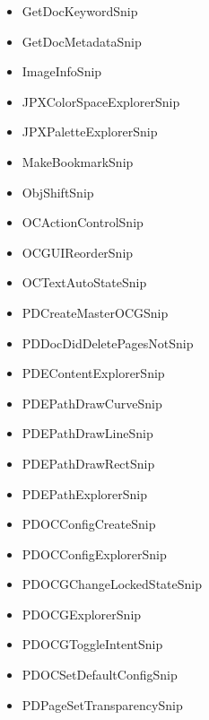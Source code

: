 \documentclass[letterpaper,12pt,english,openany,oneside]{sphinxmanual}
\begin{document}
\begin{itemize}
\item {} 
GetDocKeywordSnip

\item {} 
GetDocMetadataSnip

\item {} 
ImageInfoSnip

\item {} 
JPXColorSpaceExplorerSnip

\item {} 
JPXPaletteExplorerSnip

\item {} 
MakeBookmarkSnip

\item {} 
ObjShiftSnip

\item {} 
OCActionControlSnip

\item {} 
OCGUIReorderSnip

\item {} 
OCTextAutoStateSnip

\item {} 
PDCreateMasterOCGSnip

\item {} 
PDDocDidDeletePagesNotSnip

\item {} 
PDEContentExplorerSnip

\item {} 
PDEPathDrawCurveSnip

\item {} 
PDEPathDrawLineSnip

\item {} 
PDEPathDrawRectSnip

\item {} 
PDEPathExplorerSnip

\item {} 
PDOCConfigCreateSnip

\item {} 
PDOCConfigExplorerSnip

\item {} 
PDOCGChangeLockedStateSnip

\item {} 
PDOCGExplorerSnip

\item {} 
PDOCGToggleIntentSnip

\item {} 
PDOCSetDefaultConfigSnip

\item {} 
PDPageSetTransparencySnip


\end{itemize}
\end{document}
